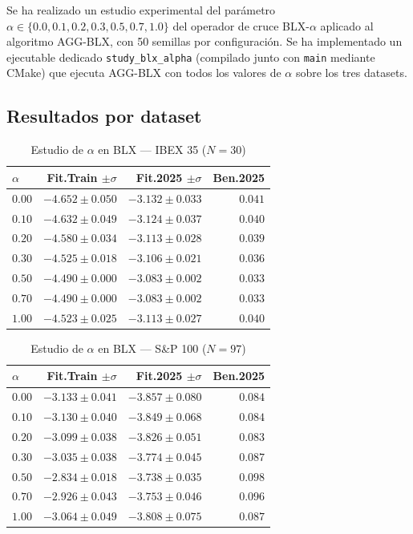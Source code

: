 \documentclass[12pt,a4paper]{article}
\begin{document}
Se ha realizado un estudio experimental del parámetro $\alpha \in \{0.0, 0.1, 0.2, 0.3,
0.5, 0.7, 1.0\}$ del operador de cruce BLX-$\alpha$ aplicado al algoritmo AGG-BLX, con
50 semillas por configuración. Se ha implementado un ejecutable dedicado
\texttt{study\_blx\_alpha} (compilado junto con \texttt{main} mediante CMake) que ejecuta
AGG-BLX con todos los valores de $\alpha$ sobre los tres datasets.

\subsection{Resultados por dataset}

\begin{table}[H]
\centering\footnotesize
\caption{Estudio de $\alpha$ en BLX --- IBEX 35 ($N=30$)}
\begin{tabular}{lrrr}
\toprule
$\alpha$ & \textbf{Fit.Train} $\pm\sigma$ & \textbf{Fit.2025} $\pm\sigma$ & \textbf{Ben.2025} \\
\midrule
$0.00$ & $-4.652 \pm 0.050$ & $-3.132 \pm 0.033$ & $0.041$ \\
$0.10$ & $-4.632 \pm 0.049$ & $-3.124 \pm 0.037$ & $0.040$ \\
$0.20$ & $-4.580 \pm 0.034$ & $-3.113 \pm 0.028$ & $0.039$ \\
$0.30$ & $-4.525 \pm 0.018$ & $-3.106 \pm 0.021$ & $0.036$ \\
$0.50$ & $-4.490 \pm 0.000$ & $-3.083 \pm 0.002$ & $0.033$ \\
$0.70$ & $-4.490 \pm 0.000$ & $-3.083 \pm 0.002$ & $0.033$ \\
$1.00$ & $-4.523 \pm 0.025$ & $-3.113 \pm 0.027$ & $0.040$ \\
\bottomrule
\end{tabular}
\end{table}

\begin{table}[H]
\centering\footnotesize
\caption{Estudio de $\alpha$ en BLX --- S\&P 100 ($N=97$)}
\begin{tabular}{lrrr}
\toprule
$\alpha$ & \textbf{Fit.Train} $\pm\sigma$ & \textbf{Fit.2025} $\pm\sigma$ & \textbf{Ben.2025} \\
\midrule
$0.00$ & $-3.133 \pm 0.041$ & $-3.857 \pm 0.080$ & $0.084$ \\
$0.10$ & $-3.130 \pm 0.040$ & $-3.849 \pm 0.068$ & $0.084$ \\
$0.20$ & $-3.099 \pm 0.038$ & $-3.826 \pm 0.051$ & $0.083$ \\
$0.30$ & $-3.035 \pm 0.038$ & $-3.774 \pm 0.045$ & $0.087$ \\
$0.50$ & $-2.834 \pm 0.018$ & $-3.738 \pm 0.035$ & $0.098$ \\
$0.70$ & $-2.926 \pm 0.043$ & $-3.753 \pm 0.046$ & $0.096$ \\
$1.00$ & $-3.064 \pm 0.049$ & $-3.808 \pm 0.075$ & $0.087$ \\
\bottomrule
\end{tabular}
\end{table}
\end{document}
